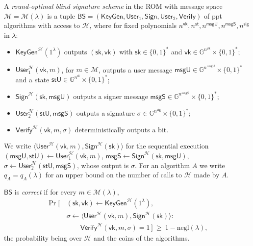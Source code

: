 \documentclass{conjura-conjecture}
\newcommand{\GG}{\mathbb{G}}
\newcommand{\MM}{\mathcal{M}}
\newcommand{\HH}{\mathcal{H}}
\newcommand{\negl}{\mathrm{negl}}
\newcommand{\BS}{\mathsf{BS}}
\newcommand{\KeyGen}{\mathsf{KeyGen}}
\newcommand{\Userone}{\mathsf{User}_1}
\newcommand{\Usertwo}{\mathsf{User}_2}
\newcommand{\Usr}{\mathsf{User}}
\newcommand{\Sig}{\mathsf{Sign}}
\newcommand{\Ver}{\mathsf{Verify}}
\newcommand{\sky}{\mathsf{sk}}
\newcommand{\vky}{\mathsf{vk}}
\newcommand{\stU}{\mathsf{stU}}
\newcommand{\msgU}{\mathsf{msgU}}
\newcommand{\msgS}{\mathsf{msgS}}
\begin{document}
\begin{definition}
\label{def:bs}
A \emph{round-optimal blind signature scheme} in the ROM with message
space $\MM=\MM(\lambda)$ is a tuple
$\BS=(\KeyGen,\Userone,\Sig,\Usertwo,\Ver)$ of ppt algorithms with
access to $\HH$, where for fixed polynomials
$n^{\mathsf{vk}},n^{\mathsf{st}},n^{\mathsf{msgU}},n^{\mathsf{msgS}},
n^{\mathsf{sig}}$ in $\lambda$:
\begin{itemize}
  \item $\KeyGen^{\HH}(1^{\lambda})$ outputs $(\sky,\vky)$ with
    $\sky\in\{0,1\}^{*}$ and
    $\vky\in\GG^{n^{\mathsf{vk}}}\times\{0,1\}^{*}$;
  \item $\Userone^{\HH}(\vky,m)$, for $m\in\MM$, outputs a user message
    $\msgU\in\GG^{n^{\mathsf{msgU}}}\times\{0,1\}^{*}$ and a state
    $\stU\in\GG^{n^{\mathsf{st}}}\times\{0,1\}^{*}$;
  \item $\Sig^{\HH}(\sky,\msgU)$ outputs a signer message
    $\msgS\in\GG^{n^{\mathsf{msgS}}}\times\{0,1\}^{*}$;
  \item $\Usertwo^{\HH}(\stU,\msgS)$ outputs a signature
    $\sigma\in\GG^{n^{\mathsf{sig}}}\times\{0,1\}^{*}$;
  \item $\Ver^{\HH}(\vky,m,\sigma)$ deterministically outputs a bit.
\end{itemize}
We write $\langle\Usr^{\HH}(\vky,m),\Sig^{\HH}(\sky)\rangle$ for the
sequential execution
$(\msgU,\stU)\leftarrow\Userone^{\HH}(\vky,m)$,
$\msgS\leftarrow\Sig^{\HH}(\sky,\msgU)$,
$\sigma\leftarrow\Usertwo^{\HH}(\stU,\msgS)$, whose output is $\sigma$.
For an algorithm $A$ we write $q_{A}=q_{A}(\lambda)$ for an upper bound
on the number of calls to $\HH$ made by $A$.

$\BS$ is \emph{correct} if for every $m\in\MM(\lambda)$,
\begin{align*}
\Pr\bigl[\,
  &(\sky,\vky)\leftarrow\KeyGen^{\HH}(1^{\lambda}),\\
  &\sigma\leftarrow\langle\Usr^{\HH}(\vky,m),\Sig^{\HH}(\sky)\rangle:\\
  &\qquad \Ver^{\HH}(\vky,m,\sigma)=1\,\bigr]
   \ \ge\ 1-\negl(\lambda),
\end{align*}
the probability being over $\HH$ and the coins of the algorithms.
\end{definition}
\end{document}
